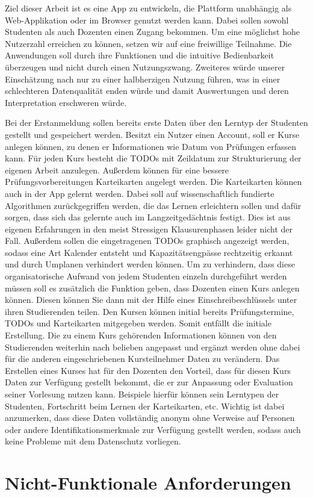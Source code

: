 Ziel dieser Arbeit ist es eine App zu entwickeln, die Plattform unabhängig als Web-Applikation oder im Browser genutzt werden kann.
Dabei sollen sowohl Studenten als auch Dozenten einen Zugang bekommen.
Um eine möglichst hohe Nutzerzahl erreichen zu können, setzen wir auf eine freiwillige Teilnahme.
Die Anwendungen soll durch ihre Funktionen und die intuitive Bedienbarkeit überzeugen und nicht durch einen Nutzungszwang.
Zweiteres würde unserer Einschätzung nach nur zu einer halbherzigen Nutzung führen, was in einer schlechteren Datenqualität enden würde und damit Auswertungen und deren Interpretation erschweren würde. 

Bei der Erstanmeldung sollen bereits erste Daten über den Lerntyp der Studenten gestellt und gespeichert werden.
Besitzt ein Nutzer einen Account, soll er Kurse anlegen können, zu denen er Informationen wie Datum von Prüfungen erfassen kann.
Für jeden Kurs besteht die TODOs mit Zeildatum zur Strukturierung der eigenen Arbeit anzulegen.
Außerdem können für eine bessere Prüfungsvorbereitungen Karteikarten angelegt werden.
Die Karteikarten können auch in der App gelernt werden.
Dabei soll auf wissenschaftlich fundierte Algorithmen zurückgegriffen werden, die das Lernen erleichtern sollen und dafür sorgen, dass sich das gelernte auch im Langzeitgedächtnis festigt.
Dies ist aus eigenen Erfahrungen in den meist Stressigen Klausurenphasen leider nicht der Fall.
Außerdem sollen die eingetragenen TODOs graphisch angezeigt werden, sodass eine Art Kalender entsteht und Kapazitätsengpässe rechtzeitig erkannt und durch Umplanen verhindert werden können.
Um zu verhindern, dass diese organisatorische Aufwand von jedem Studenten einzeln durchgeführt werden müssen soll es zusätzlich die Funktion geben, dass Dozenten einen Kurs anlegen können.
Diesen können Sie dann mit der Hilfe eines Einschreibeschlüssels unter ihren Studierenden teilen.
Den Kursen können initial bereits Prüfungstermine, TODOs und Karteikarten mitgegeben werden.
Somit entfällt die initiale Erstellung.
Die zu einem Kurs gehörenden Informationen können von den Studierenden weiterhin nach belieben angepasst und ergänzt werden ohne dabei für die anderen eingeschriebenen Kursteilnehmer Daten zu verändern.
Das Erstellen eines Kurses hat für den Dozenten den Vorteil, dass für diesen Kurs Daten zur Verfügung gestellt bekommt, die er zur Anpassung oder Evaluation seiner Vorlesung nutzen kann.
Beispiele hierfür können sein Lerntypen der Studenten, Fortschritt beim Lernen der Karteikarten, etc.
Wichtig ist dabei anzumerken, dass diese Daten vollständig anonym ohne Verweise auf Personen oder andere Identifikationsmerkmale zur Verfügung gestellt werden, sodass auch keine Probleme mit dem Datenschutz vorliegen. 



\section{Nicht-Funktionale Anforderungen}







